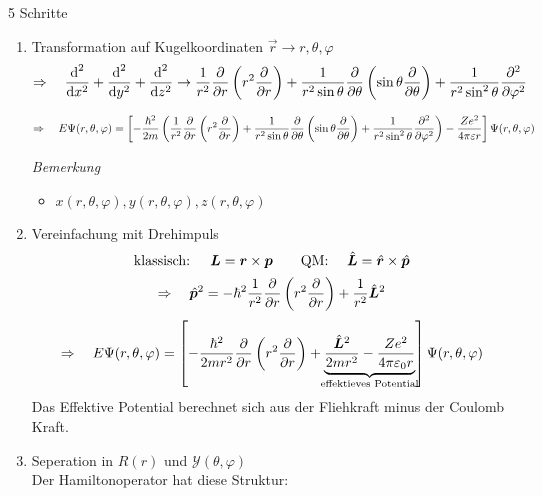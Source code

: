 5 Schritte
\begin{enumerate}[(1)]
	\item Transformation auf Kugelkoordinaten $ \vec{r} \to r, \theta, \varphi $
	\begin{equation*}
	\Rightarrow \quad \frac{\textrm{d} ^2}{\textrm{d} x^2} + \frac{\textrm{d} ^2}{\textrm{d} y^2} + \frac{\textrm{d} ^2}{\textrm{d} z^2} \to \frac{1}{r^2} \frac{\partial }{\partial r} \left(r^2 \frac{\partial }{\partial r}\right) + \frac{1}{r^2 \sin \theta} \frac{\partial }{\partial \theta} \left(\sin \theta \frac{\partial }{\partial \theta}\right) + \frac{1}{r^2 \sin^2 \theta} \frac{\partial ^2}{\partial \varphi^2}
	\end{equation*}
	\begin{footnotesize}
		\begin{equation*}
		\Rightarrow \quad E \Psi(r,\theta,\varphi) = \left[-\frac{\hbar^2}{2m} \left(\frac{1}{r^2} \frac{\partial }{\partial r} \left(r^2 \frac{\partial }{\partial r}\right) + \frac{1}{r^2 \sin \theta} \frac{\partial }{\partial \theta} \left(\sin \theta \frac{\partial }{\partial \theta}\right) + \frac{1}{r^2 \sin^2 \theta} \frac{\partial ^2}{\partial \varphi^2}\right) - \frac{Ze^2}{4 \pi \varepsilon r} \right] \Psi(r,\theta,\varphi)
		\end{equation*}
	\end{footnotesize}
	\emph{Bemerkung}
	\begin{itemize}
		\item $ x(r,\theta,\varphi), y(r,\theta,\varphi), z(r,\theta,\varphi) $
	\end{itemize}
	\item Vereinfachung mit Drehimpuls
	\begin{equation*}
	\textrm{klassisch: } \quad \bm{L} = \bm{r} \times \bm{p} \qquad \textrm{QM: } \quad \hat{\bm{L}} = \hat{\bm{r}} \times \hat{\bm{p}}
	\end{equation*}
	\begin{equation*}
	\Rightarrow \quad \hat{\bm{p}}^2 = - \hbar^2 \frac{1}{r^2} \frac{\partial }{\partial r} \left(r^2 \frac{\partial }{\partial r}\right) + \frac{1}{r^2} \hat{\bm{L}}^2
	\end{equation*}
	\begin{equation*}
	\Rightarrow \quad E \Psi(r,\theta,\varphi) = \left[-\frac{\hbar^2}{2mr^2} \prt{}{r} \left(r^2 \prt{}{r}\right) + \ub{\frac{\hat{\vec{L}}^2}{2mr^2} - \frac{Ze^2}{4 \pi \epsilon_0 r}}_{\mathclap{\tx{effektieves Potential}}}\right] \Psi(r,\theta,\varphi)
	\end{equation*}
	Das Effektive Potential berechnet sich aus der Fliehkraft minus der Coulomb Kraft.
	\item Seperation in $ R(r) $ und $ \mathcal{Y}(\theta,\varphi) $\\
	Der Hamiltonoperator hat diese Struktur:

\end{enumerate}
